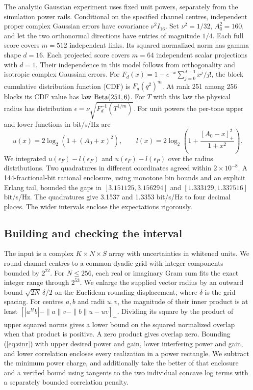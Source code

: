 \documentclass[lineno,pdflatex,sn-nature]{sn-jnl}
\begin{document}
The analytic Gaussian experiment uses fixed unit powers, separately from the simulation power rails. Conditional on the specified channel centres, independent proper complex Gaussian errors have covariance \(\nu^2 I_{16}\). Set \(\nu^2=1/32\), \(A_0^2=160\), and let the two orthonormal directions have entries of magnitude \(1/4\). Each full score covers \(m=512\) independent links. Its squared normalized norm has gamma shape \(d=16\). Each projected score covers \(m=64\) independent scalar projections with \(d=1\). Their independence in this model follows from orthogonality and isotropic complex Gaussian errors. For \(F_d(x)=1-e^{-x}\sum_{j=0}^{d-1}x^j/j!\), the block cumulative distribution function (CDF) is \(F_d(q^2)^m\). At rank 251 among 256 blocks its CDF value has law \({\rm Beta}(251,6)\). For \(T\) with this law the physical radius has distribution \(\epsilon=\nu\sqrt{F_d^{-1}(T^{1/m})}\). For unit powers the per-tone upper and lower functions in bit/s/Hz are
\[
 u(x)=2\log_2(1+(A_0+x)^2),\qquad
 l(x)=2\log_2\!\left(1+\frac{\left[A_0-x\right]_{+}^2}{1+x^2}\right).
\]
We integrated \(u(\epsilon_F)-l(\epsilon_F)\) and \(u(\epsilon_F)-l(\epsilon_P)\) over the radius distributions. Two quadratures in different coordinates agreed within \(2\times10^{-8}\). A 144-fractional-bit rational enclosure, using monotone bin bounds and an explicit Erlang tail, bounded the gaps in \([3.151125,3.156294]\) and \([1.333129,1.337516]\) bit/s/Hz. The quadratures give 3.1537 and 1.3353 bit/s/Hz to four decimal places. The wider intervals enclose the expectations rigorously.

\subsection*{Building and checking the interval}
The input is a complex \(K\times N\times S\) array with uncertainties in whitened units. We round channel centres to a common dyadic grid with integer components bounded by \(2^{22}\). For \(N\leq256\), each real or imaginary Gram sum fits the exact integer range through \(2^{53}\). We enlarge the supplied vector radius by an outward bound \(\sqrt{2N}\,\delta/2\) on the Euclidean rounding displacement, where \(\delta\) is the grid spacing. For centres \(a,b\) and radii \(u,v\), the magnitude of their inner product is at least \(\left[|a^Hb|-\|a\|v-\|b\|u-uv\right]_{+}\). Dividing its square by the product of upper squared norms gives a lower bound on the squared normalized overlap when that product is positive. A zero product gives overlap zero. Bounding (\ref{eq:sinr}) with upper desired power and gain, lower interfering power and gain, and lower correlation encloses every realization in a power rectangle. We subtract the minimum power charge, and additionally take the better of that enclosure and a verified bound using tangents to the two individual concave log terms with a separately bounded correlation penalty.
\end{document}
